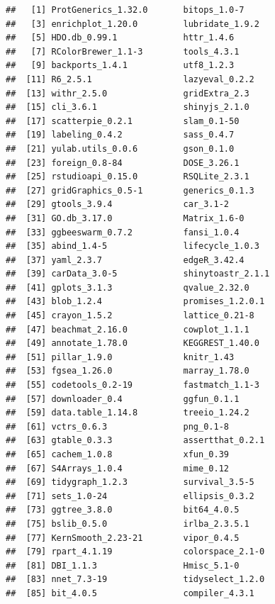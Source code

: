 \documentclass[
  11pt,
]{article}
\begin{document}
\begin{verbatim}
##   [1] ProtGenerics_1.32.0       bitops_1.0-7             
##   [3] enrichplot_1.20.0         lubridate_1.9.2          
##   [5] HDO.db_0.99.1             httr_1.4.6               
##   [7] RColorBrewer_1.1-3        tools_4.3.1              
##   [9] backports_1.4.1           utf8_1.2.3               
##  [11] R6_2.5.1                  lazyeval_0.2.2           
##  [13] withr_2.5.0               gridExtra_2.3            
##  [15] cli_3.6.1                 shinyjs_2.1.0            
##  [17] scatterpie_0.2.1          slam_0.1-50              
##  [19] labeling_0.4.2            sass_0.4.7               
##  [21] yulab.utils_0.0.6         gson_0.1.0               
##  [23] foreign_0.8-84            DOSE_3.26.1              
##  [25] rstudioapi_0.15.0         RSQLite_2.3.1            
##  [27] gridGraphics_0.5-1        generics_0.1.3           
##  [29] gtools_3.9.4              car_3.1-2                
##  [31] GO.db_3.17.0              Matrix_1.6-0             
##  [33] ggbeeswarm_0.7.2          fansi_1.0.4              
##  [35] abind_1.4-5               lifecycle_1.0.3          
##  [37] yaml_2.3.7                edgeR_3.42.4             
##  [39] carData_3.0-5             shinytoastr_2.1.1        
##  [41] gplots_3.1.3              qvalue_2.32.0            
##  [43] blob_1.2.4                promises_1.2.0.1         
##  [45] crayon_1.5.2              lattice_0.21-8           
##  [47] beachmat_2.16.0           cowplot_1.1.1            
##  [49] annotate_1.78.0           KEGGREST_1.40.0          
##  [51] pillar_1.9.0              knitr_1.43               
##  [53] fgsea_1.26.0              marray_1.78.0            
##  [55] codetools_0.2-19          fastmatch_1.1-3          
##  [57] downloader_0.4            ggfun_0.1.1              
##  [59] data.table_1.14.8         treeio_1.24.2            
##  [61] vctrs_0.6.3               png_0.1-8                
##  [63] gtable_0.3.3              assertthat_0.2.1         
##  [65] cachem_1.0.8              xfun_0.39                
##  [67] S4Arrays_1.0.4            mime_0.12                
##  [69] tidygraph_1.2.3           survival_3.5-5           
##  [71] sets_1.0-24               ellipsis_0.3.2           
##  [73] ggtree_3.8.0              bit64_4.0.5              
##  [75] bslib_0.5.0               irlba_2.3.5.1            
##  [77] KernSmooth_2.23-21        vipor_0.4.5              
##  [79] rpart_4.1.19              colorspace_2.1-0         
##  [81] DBI_1.1.3                 Hmisc_5.1-0              
##  [83] nnet_7.3-19               tidyselect_1.2.0         
##  [85] bit_4.0.5                 compiler_4.3.1           

\end{verbatim}
\end{document}

